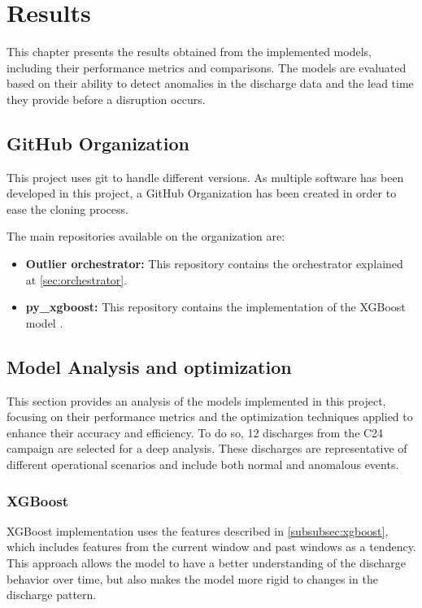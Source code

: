 \chapter{Results}\label{sec:cap4}

This chapter presents the results obtained from the implemented models, including their performance metrics and comparisons. The models are evaluated based on their ability to detect anomalies in the discharge data and the lead time they provide before a disruption occurs.

\section{GitHub Organization}

This project uses git to handle different versions. As multiple software has been developed in this project, a GitHub Organization has been created in order to ease the cloning process.

The main repositories available on the organization are:

\begin{itemize}
    \item \textbf{Outlier orchestrator:} This repository contains the orchestrator explained at \autoref{sec:orchestrator}. 
    \item \textbf{py\_xgboost:} This repository contains the implementation of the XGBoost model \autocite{OutlierClassifierPy_xgboost2025}.
\end{itemize}

\section{Model Analysis and optimization}

This section provides an analysis of the models implemented in this project, focusing on their performance metrics and the optimization techniques applied to enhance their accuracy and efficiency. To do so, 12 discharges from the C24 campaign are selected for a deep analysis. These discharges are representative of different operational scenarios and include both normal and anomalous events. 

\subsection{XGBoost}

XGBoost implementation uses the features described in \autoref{subsubsec:xgboost}, which includes features from the current window and past windows as a tendency. This approach allows the model to have a better understanding of the discharge behavior over time, but also makes the model more rigid to changes in the discharge pattern.


